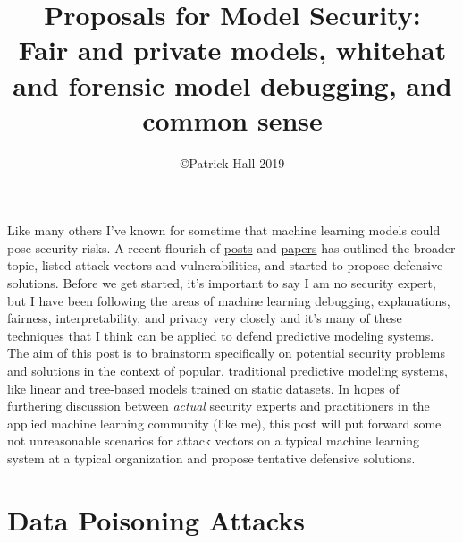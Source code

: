 \documentclass[fleqn]{article}
\title{Proposals for Model Security:\\\vspace{5pt}\normalsize{Fair and private models, whitehat and forensic model debugging, and common sense}}
\author{\copyright Patrick Hall 2019}
\begin{document}
\maketitle

Like many others I've known for sometime that machine learning models could pose security risks. A recent flourish of \href{https://www.oreilly.com/ideas/you-created-a-machine-learning-application-now-make-sure-its-secure}{posts} and \href{https://arxiv.org/pdf/1811.01134.pdf}{papers} has outlined the broader topic, listed attack vectors and vulnerabilities, and started to propose defensive solutions. Before we get started, it's important to say I am no security expert, but I have been following the areas of machine learning debugging, explanations, fairness, interpretability, and privacy very closely and it's many of these techniques that I think can be applied to defend predictive modeling systems. The aim of this post is to brainstorm specifically on potential security problems and solutions in the context of popular, traditional predictive modeling systems, like linear and tree-based models trained on static datasets. In hopes of furthering discussion between \textit{actual} security experts and practitioners in the applied machine learning community (like me), this post will put forward some not unreasonable scenarios for attack vectors on a typical machine learning system at a typical organization and propose tentative defensive solutions. 

\section{Data Poisoning Attacks} \label{sec:data_poisoning}
\end{document}
